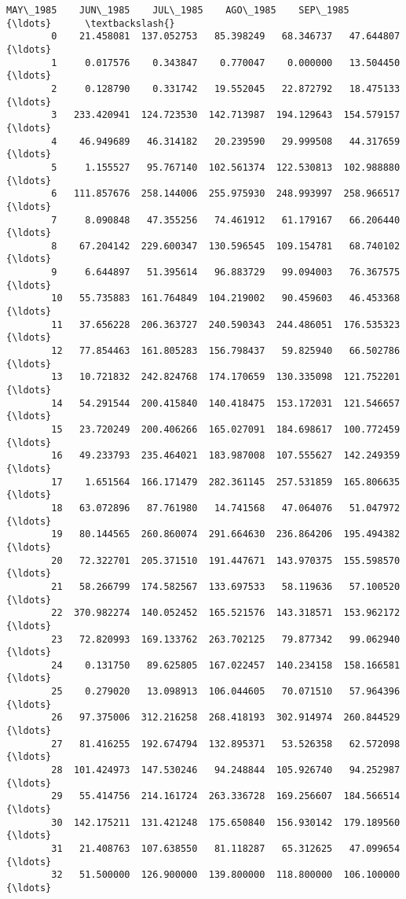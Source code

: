 \documentclass[11pt]{article}
\begin{document}
\begin{Verbatim}[commandchars=\\\{\}]
              MAY\_1985    JUN\_1985    JUL\_1985    AGO\_1985    SEP\_1985     {\ldots}      \textbackslash{}
        0    21.458081  137.052753   85.398249   68.346737   47.644807     {\ldots}       
        1     0.017576    0.343847    0.770047    0.000000   13.504450     {\ldots}       
        2     0.128790    0.331742   19.552045   22.872792   18.475133     {\ldots}       
        3   233.420941  124.723530  142.713987  194.129643  154.579157     {\ldots}       
        4    46.949689   46.314182   20.239590   29.999508   44.317659     {\ldots}       
        5     1.155527   95.767140  102.561374  122.530813  102.988880     {\ldots}       
        6   111.857676  258.144006  255.975930  248.993997  258.966517     {\ldots}       
        7     8.090848   47.355256   74.461912   61.179167   66.206440     {\ldots}       
        8    67.204142  229.600347  130.596545  109.154781   68.740102     {\ldots}       
        9     6.644897   51.395614   96.883729   99.094003   76.367575     {\ldots}       
        10   55.735883  161.764849  104.219002   90.459603   46.453368     {\ldots}       
        11   37.656228  206.363727  240.590343  244.486051  176.535323     {\ldots}       
        12   77.854463  161.805283  156.798437   59.825940   66.502786     {\ldots}       
        13   10.721832  242.824768  174.170659  130.335098  121.752201     {\ldots}       
        14   54.291544  200.415840  140.418475  153.172031  121.546657     {\ldots}       
        15   23.720249  200.406266  165.027091  184.698617  100.772459     {\ldots}       
        16   49.233793  235.464021  183.987008  107.555627  142.249359     {\ldots}       
        17    1.651564  166.171479  282.361145  257.531859  165.806635     {\ldots}       
        18   63.072896   87.761980   14.741568   47.064076   51.047972     {\ldots}       
        19   80.144565  260.860074  291.664630  236.864206  195.494382     {\ldots}       
        20   72.322701  205.371510  191.447671  143.970375  155.598570     {\ldots}       
        21   58.266799  174.582567  133.697533   58.119636   57.100520     {\ldots}       
        22  370.982274  140.052452  165.521576  143.318571  153.962172     {\ldots}       
        23   72.820993  169.133762  263.702125   79.877342   99.062940     {\ldots}       
        24    0.131750   89.625805  167.022457  140.234158  158.166581     {\ldots}       
        25    0.279020   13.098913  106.044605   70.071510   57.964396     {\ldots}       
        26   97.375006  312.216258  268.418193  302.914974  260.844529     {\ldots}       
        27   81.416255  192.674794  132.895371   53.526358   62.572098     {\ldots}       
        28  101.424973  147.530246   94.248844  105.926740   94.252987     {\ldots}       
        29   55.414756  214.161724  263.336728  169.256607  184.566514     {\ldots}       
        30  142.175211  131.421248  175.650840  156.930142  179.189560     {\ldots}       
        31   21.408763  107.638550   81.118287   65.312625   47.099654     {\ldots}       
        32   51.500000  126.900000  139.800000  118.800000  106.100000     {\ldots}       
        

\end{Verbatim}
\end{document}
